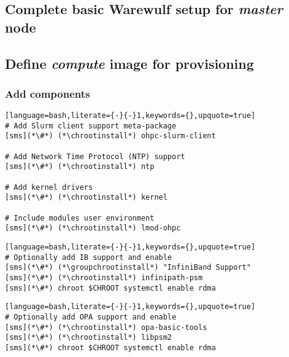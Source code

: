 \documentclass[letterpaper]{article}
\newcommand{\chrootinstall}{yum -y --installroot=\$CHROOT install}
\newcommand{\groupchrootinstall}{yum -y --installroot=\$CHROOT groupinstall}
\begin{document}
\vspace*{-0.15cm}
\subsection{Complete basic Warewulf setup for {\em master} node} \label{sec:setup_ww}




\subsection{Define {\em compute} image for provisioning}


\subsubsection{Add \OHPC{} components} \label{sec:add_components}


\begin{lstlisting}[language=bash,literate={-}{-}1,keywords={},upquote=true]
# Add Slurm client support meta-package
[sms](*\#*) (*\chrootinstall*) ohpc-slurm-client

# Add Network Time Protocol (NTP) support
[sms](*\#*) (*\chrootinstall*) ntp

# Add kernel drivers
[sms](*\#*) (*\chrootinstall*) kernel

# Include modules user environment
[sms](*\#*) (*\chrootinstall*) lmod-ohpc
\end{lstlisting}

\begin{lstlisting}[language=bash,literate={-}{-}1,keywords={},upquote=true]
# Optionally add IB support and enable
[sms](*\#*) (*\groupchrootinstall*) "InfiniBand Support"
[sms](*\#*) (*\chrootinstall*) infinipath-psm
[sms](*\#*) chroot $CHROOT systemctl enable rdma
\end{lstlisting}

\begin{lstlisting}[language=bash,literate={-}{-}1,keywords={},upquote=true]
# Optionally add OPA support and enable
[sms](*\#*) (*\chrootinstall*) opa-basic-tools
[sms](*\#*) (*\chrootinstall*) libpsm2
[sms](*\#*) chroot $CHROOT systemctl enable rdma
\end{lstlisting}
\end{document}
